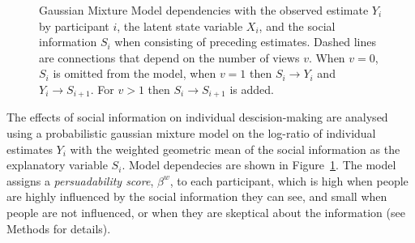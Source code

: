 \documentclass[9pt,a4paper,twocolumn,lineno]{article}
\begin{document}
\begin{figure}[!h]
\centering
{}
	\caption{\footnotesize Gaussian Mixture Model dependencies with the observed estimate $Y_i$ by participant $i$, the latent state variable $X_i$, and the social information $S_i$ when consisting of preceding estimates. Dashed lines are connections that depend on the number of views $v$. When $v=0$, $S_i$ is omitted from the model, when $v=1$ then $S_i\to Y_i$ and $Y_i\to S_{i+1}$. For $v>1$ then $S_i\to S_{i+1}$ is added.}
\label{fig:model}
\end{figure}

The effects of social information on individual descision-making are analysed using a probabilistic gaussian mixture model on the log-ratio of individual estimates $Y_i$ with the weighted geometric mean of the social information as the explanatory variable $S_i$. Model dependecies are shown in Figure~\ref{fig:model}. The model assigns a \textit{persuadability score}, $\beta^w$, to each participant, which is high when people are highly influenced by the social information they can see, and small when people are not influenced, or when they are skeptical about the information (see Methods for details). 
\end{document}
